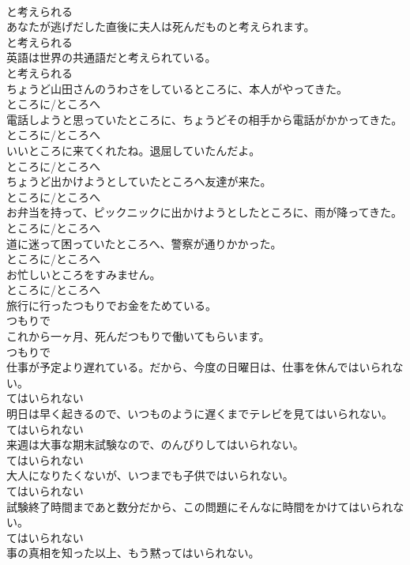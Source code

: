 \documentclass[8pt]{extreport}
\begin{document}
\begin{CJK}{UTF8}{min}
\\	と考えられる
\\	あなたが逃げだした直後に夫人は死んだものと考えられます。	
\\	と考えられる
\\	英語は世界の共通語だと考えられている。	
\\	と考えられる
\\	ちょうど山田さんのうわさをしているところに、本人がやってきた。	
\\	ところに/ところへ
\\	電話しようと思っていたところに、ちょうどその相手から電話がかかってきた。	
\\	ところに/ところへ
\\	いいところに来てくれたね。退屈していたんだよ。	
\\	ところに/ところへ
\\	ちょうど出かけようとしていたところへ友達が来た。	
\\	ところに/ところへ
\\	お弁当を持って、ピックニックに出かけようとしたところに、雨が降ってきた。	
\\	ところに/ところへ
\\	道に迷って困っていたところへ、警察が通りかかった。	
\\	ところに/ところへ
\\	お忙しいところをすみません。	
\\	ところに/ところへ
\\	旅行に行ったつもりでお金をためている。	
\\	つもりで
\\	これから一ヶ月、死んだつもりで働いてもらいます。	
\\	つもりで
\\	仕事が予定より遅れている。だから、今度の日曜日は、仕事を休んではいられない。	
\\	てはいられない
\\	明日は早く起きるので、いつものように遅くまでテレビを見てはいられない。	
\\	てはいられない
\\	来週は大事な期末試験なので、のんびりしてはいられない。	
\\	てはいられない
\\	大人になりたくないが、いつまでも子供ではいられない。	
\\	てはいられない
\\	試験終了時間まであと数分だから、この問題にそんなに時間をかけてはいられない。	
\\	てはいられない
\\	事の真相を知った以上、もう黙ってはいられない。	

\end{CJK}
\end{document}
